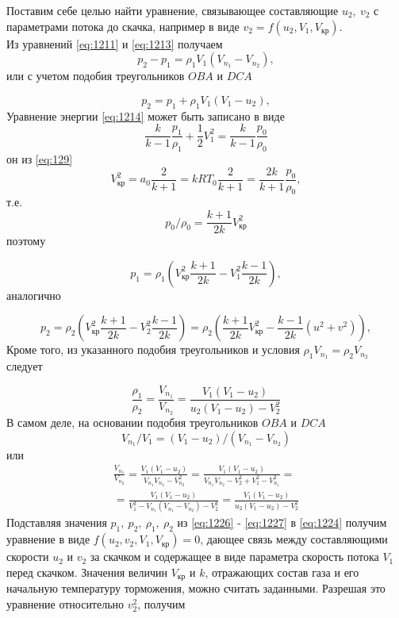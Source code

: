\documentclass[specialist, subf, href, colorlinks=true, 14pt, final]{disser}
\theoremstyle{definition}
\begin{document}
Поставим себе целью найти уравнение, связывающее составляющие $u_{2},\ v_{2}$ с параметрами потока до скачка, например в виде $v_{2} = f(u_{2}, V_{1}, V_{\text{кр}})$.\\
Из уравнений \eqref{eq:1211} и \eqref{eq:1213} получаем
\[
  p_{2}-p_{1} = \rho_{1}V_{1}(V_{n_1}-V_{n_2}),
\]
или с учетом подобия треугольников $OBA$ и $DCA$
\addtocounter{equation}{1}
\begin{equation}\label{eq:1224}
  p_{2} = p_{1} + \rho_{1}V_{1}(V_{1}-u_{2}),
  \tag{24}
\end{equation}
Уравнение энергии \eqref{eq:1214} может быть записано в виде
\[
  \frac{k}{k-1}\frac{p_1}{\rho_1} + \frac{1}{2}V_{1}^{2} = \frac{k}{k-1}\frac{p_{0}}{\rho_0}
\]
он из \eqref{eq:129}
\[
  V_{\text{кр}}^{2} = a_{0}\frac{2}{k+1} = kRT_{0}\frac{2}{k+1} = \frac{2k}{k+1}\frac{p_0}{\rho_0},
\]
т.е.
\[
  p_{0}/\rho_{0} = \frac{k+1}{2k}V_{\text{кр}}^{2}
\]
поэтому
\addtocounter{equation}{1}
\begin{equation}\label{eq:1225}
  p_{1} = \rho_{1}\left(V_{\text{кр}}^{2}\frac{k+1}{2k} - V_{1}^{2}\frac{k-1}{2k}\right),
  \tag{25}
\end{equation}
аналогично
\addtocounter{equation}{1}
\begin{equation}\label{eq:1226}
  p_{2} = \rho_{2}\left(V_{\text{кр}}^{2}\frac{k+1}{2k} - V_{2}^{2}\frac{k-1}{2k}\right) = \rho_{2}\left(\frac{k+1}{2k}V_{\text{кр}}^{2} - \frac{k-1}{2k}(u^{2}+v^{2})\right),
  \tag{26}
\end{equation}
Кроме того, из указанного подобия треугольников и условия $\rho_{1}V_{n_1} = \rho_{2}V_{n_2}$ следует
\addtocounter{equation}{1}
\begin{equation}\label{eq:1227}
  \frac{\rho_1}{\rho_2} = \frac{V_{n_1}}{V_{n_2}} = \frac{V_{1}(V_{1} - u_{2})}{u_{2}(V_{1}-u_{2})-V_{2}^{2}}
  \tag{27}
\end{equation}
В самом деле, на основании подобия треугольников $OBA$ и $DCA$
\[
  V_{n_1}/V_{1} = (V_{1} - u_{2})/(V_{n_1} - V_{n_2})
\]
или
\[
\begin{aligned}
  \frac{V_{n_1}}{V_{n_2}} = \frac{V_{1}(V_{1}-u_{2})}{V_{n_1}V_{n_2} - V_{n_2}^{2}} = \frac{V_{1}(V_{1}-u_{2})}{V_{n_1}V_{n_2} - V_{2}^{2} + V_{1}^{2} - V_{n_1}^{2}} = \\
  = \frac{V_{1}(V_{1}-u_{2})}{V_{1}^{2} - V_{n_1}(V_{n_1}-V_{n_2}) - V_{2}^{2}} = \frac{V_{1}(V_{1}-u_{2})}{u_{2}(V_{1}-u_{2}) - V_{2}^{2}}
\end{aligned}
\]
Подставляя значения $p_{1},\ p_{2},\ \rho_{1},\ \rho_{2}$ из \eqref{eq:1226} - \eqref{eq:1227} в \eqref{eq:1224} получим уравнение в виде $f(u_{2}, v_{2}, V_{1}, V_{\text{кр}}) = 0$, дающее связь между составляющими скорости $u_{2}$ и $v_2$ за скачком и содержащее в виде параметра скорость потока $V_1$ перед скачком. Значения величин $V_{\text{кр}}$ и $k$, отражающих состав газа и его начальную температуру торможения, можно считать заданными. Разрешая это уравнение относительно $v_{2}^{2}$, получим
\end{document}

